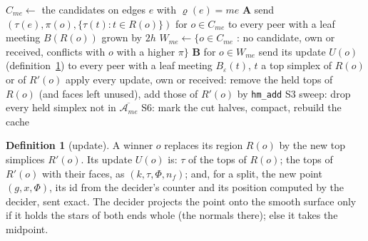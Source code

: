 \documentclass[10pt,a4paper]{article}
\theoremstyle{definition}
\newtheorem{definition}{Definition}
\newcommand{\fn}[1]{\texttt{#1}}
\begin{document}
\begin{algorithm}[H]
  \caption{\textsc{Remesh} on process $me$, after S6}
  \label{alg:part-remesh}
  \begin{algorithmic}[1]
      \Repeat
        \State $C_{me} \gets$ the candidates on edges $e$ with
          $\varrho(e) = me$ 
        \State \textbf{A} send $(\tau(e), \pi(o), \{\tau(t) : t \in
          R(o)\})$ for $o \in C_{me}$ to every peer with a leaf meeting
          $B(R(o))$ grown by $2h$
        \State $W_{me} \gets \{ o \in C_{me}$ : no candidate, own or
          received, conflicts with $o$ with a higher $\pi \}$
        \State \textbf{B} for $o \in W_{me}$ send its update $U(o)$
          (definition~\ref{def:update}) to every peer with a leaf meeting
          $B_\varepsilon(t)$, $t$ a top simplex of $R(o)$ or of $R'(o)$
        \State apply every update, own or received: remove the held tops
          of $R(o)$ (and faces left unused), add those of $R'(o)$ by
          \fn{hm\_add} 
        \State S3 
    \EndFor
    \State sweep: drop every held simplex not in $\overline{\mathcal{A}_{me}}$
    \State S6: mark the cut halves, compact, rebuild the cache
  \end{algorithmic}
\end{algorithm}

\begin{definition}[update]
  \label{def:update}
  A winner $o$ replaces its region $R(o)$ by the new top simplices
  $R'(o)$. Its update $U(o)$ is: $\tau$ of the tops of $R(o)$; the tops of
  $R'(o)$ with their faces, as $(k, \tau, \Phi, n_f)$; and, for a split,
  the new point $(g, x, \Phi)$, its id from the decider's counter and its
  position computed by the decider, sent exact. The decider projects the
  point onto the smooth surface only if it holds the stars of both ends
  whole (the normals there); else it takes the midpoint.
\end{definition}
\end{document}
